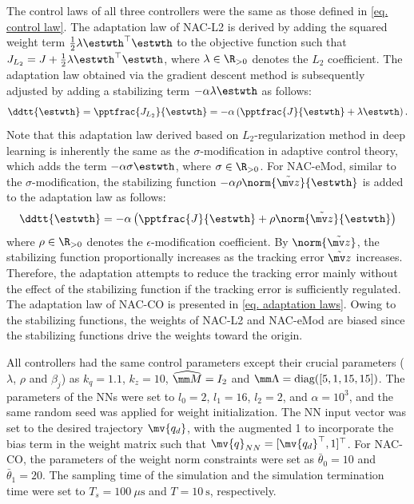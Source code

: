 \documentclass[letterpaper, 10 pt, conference]{ieeeconf}  %
\newcommand*{\q}{\mv{q}}
\newcommand*{\qd}{\mv{q_d}}
\begin{document}
The control laws of all three controllers were the same as those defined in \eqref{eq. control law}.
The adaptation law of NAC-L2 is derived by adding the squared weight term $\tfrac{1}{2}\lambda{\estwth}^\top {\estwth}$ to the objective function such that $J_{L_2} = J+\tfrac{1}{2}\lambda{\estwth}^\top {\estwth}$, where $\lambda\in\R_{>0}$ denotes the $L_2$ coefficient.
The adaptation law obtained via the gradient descent method is subsequently adjusted by adding a stabilizing term $-\alpha\lambda{\estwth}$ as follows:
\begin{equation} 
    \ddtt{{\estwth}} = 
    \pptfrac{J_{L_2}}{\estwth}
    =-\alpha
    \left(
        \pptfrac{J}{\estwth}
        +
        \lambda{\estwth}
    \right)
    .
    \label{eq. adap L2}
\end{equation}
Note that this adaptation law derived based on $L_2$-regularization method in deep learning is inherently the same as the $\sigma$-modification in adaptive control theory, which adds the term $-\alpha\sigma{\estwth}$, where $\sigma\in\R_{>0}$.
For NAC-eMod, similar to the $\sigma$-modification, the stabilizing function $-\alpha\rho\norm{\tilde{\mv z}}{\estwth}$ is added to the adaptation law as follows:
\begin{equation}
    \ddtt{{\estwth}} = -\alpha
    \left(
        \pptfrac{J}{\estwth}
        +
        \rho\norm{\tilde {\mv z}}{\estwth}
    \right)
    \label{eq. adap eMod}
\end{equation}
where $\rho\in\R_{>0}$ denotes the $\epsilon$-modification coefficient.
By $\norm{\tilde {\mv z}}$, the stabilizing function proportionally increases as the tracking error $\tilde {\mv z}$ increases.
Therefore, the adaptation attempts to reduce the tracking error mainly without the effect of the stabilizing function if the tracking error is sufficiently regulated.
The adaptation law of NAC-CO is presented in \eqref{eq. adaptation laws}.
Owing to the stabilizing functions, the weights of NAC-L2 and NAC-eMod are biased since the stabilizing functions drive the weights toward the origin.

All controllers had the same control parameters except their crucial parameters (\ie $\lambda$, $\rho$ and $\beta_j$) as $k_q=1.1$, $k_z=10$, $\widehat{\mm M}=I_2$ and $\mm \Lambda=\text{diag}([5,1,15,15])$.
The parameters of the NNs were set to $l_0=2$, $l_1=16$, $l_2=2$, and $\alpha=10^3$, and the same random seed was applied for weight initialization.
The NN input vector was set to the desired trajectory $\qd$, with the augmented 1 to incorporate the bias term in the weight matrix such that $\q_{NN}=[\qd^\top ,1]^\top $.
For NAC-CO, the parameters of the weight norm constraints were set as $\bar\theta_0=10$ and $\bar\theta_1=20$.
The sampling time of the simulation and the simulation termination time were set to $T_s=100\ \mu\mathrm{s}$ and $T=10\ \mathrm{s}$, respectively.
\end{document}
